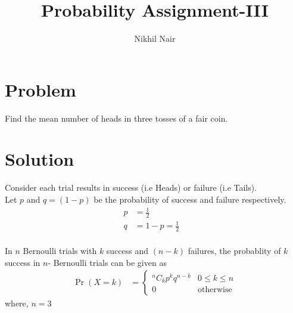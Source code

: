 \documentclass[journal,12pt,twocolumn]{IEEEtran}
\title{\mytitle}
\title{
Probability Assignment-III
}
\author{Nikhil Nair}
\providecommand{\pr}[1]{\ensuremath{\Pr\left(#1\right)}}
\begin{document}
\maketitle
\bigskip


\section{\textbf{Problem }}
Find the mean number of heads in three tosses of a fair coin.


\section{\textbf{Solution }}
Consider each trial results in success (i.e Heads) or failure (i.e Tails).
\\
 
Let $p$ and $q = (1 - p)$ be the probability of success and failure respectively.
\begin{align}
p &= \frac{1}{2}&               \label{1}
\\            
q &= 1 - p = \frac{1}{2}&       \label{2}
\end{align}
\\
In $n$ Bernoulli trials with $k$ success and $(n - k)$ failures, the probablity of $k$ success in $n$- Bernoulli trials can be given as\\
\begin{align}
\pr{X =k}  &= 
\begin{cases}
{}^nC_kp^{k}q^{n-k} & 0 \le k \le n
\\
0 & \text{otherwise}                 \label{3}
\end{cases}
\end{align}
where, $n = 3$\\
\end{document}
